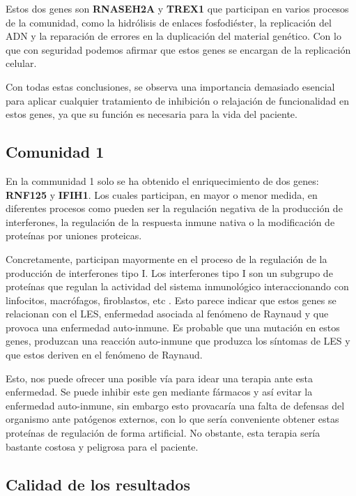 Estos dos genes son \textbf{RNASEH2A} y \textbf{TREX1} que participan en varios procesos de la comunidad, como la hidrólisis de enlaces fosfodiéster, la replicación del ADN y la reparación de errores en la duplicación del material genético. Con lo que con seguridad podemos afirmar que estos genes se encargan de la replicación celular.

Con todas estas conclusiones, se observa una importancia demasiado esencial para aplicar cualquier tratamiento de inhibición o relajación de funcionalidad en estos genes, ya que su función es necesaria para la vida del paciente.

\subsection{Comunidad 1}

En la communidad 1 solo se ha obtenido el enriquecimiento de dos genes: \textbf{RNF125} y \textbf{IFIH1}. Los cuales participan, en mayor o menor medida, en diferentes procesos como pueden ser la regulación negativa de la producción de interferones, la regulación de la respuesta inmune nativa o la modificación de proteínas por uniones proteicas.

Concretamente, participan mayormente en el proceso de la regulación de la producción de interferones tipo I. Los interferones tipo I son un subgrupo de proteínas que regulan la actividad del sistema inmunológico interaccionando con linfocitos, macrófagos, firoblastos, etc \cite{Meager2006TheApplication}. Esto parece indicar que estos genes se relacionan con el LES, enfermedad asociada al fenómeno de Raynaud y que provoca una enfermedad auto-inmune.
Es probable que una mutación en estos genes, produzcan una reacción auto-inmune que produzca los síntomas de LES y que estos deriven en el fenómeno de Raynaud.

Esto, nos puede ofrecer una posible vía para idear una terapia ante esta enfermedad. Se puede inhibir este gen mediante fármacos y así evitar la enfermedad auto-inmune, sin embargo esto provacaría una falta de defensas del organismo ante patógenos externos, con lo que sería conveniente obtener estas proteínas de regulación de forma artificial. No obstante, esta terapia sería bastante costosa y peligrosa para el paciente.

\subsection{Calidad de los resultados}

